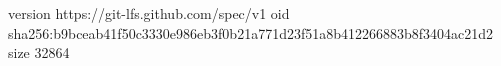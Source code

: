 version https://git-lfs.github.com/spec/v1
oid sha256:b9bceab41f50c3330e986eb3f0b21a771d23f51a8b412266883b8f3404ac21d2
size 32864
